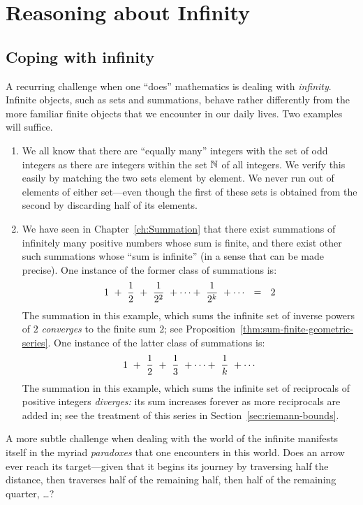 \section{Reasoning about Infinity}
\label{sec:reasoning-infinity}

\subsection{Coping with infinity}
\label{sec:coping-infinity}

A recurring challenge when one ``does'' mathematics is dealing with
{\em infinity}.  Infinite objects, such as sets and summations, behave
rather differently from the more familiar finite objects that we
encounter in our daily lives.  Two examples will suffice.  
\begin{enumerate}
\item
We all know that there are ``equally many'' integers with the set of
odd integers as there are integers within the set $\mathbb{N}$ of all
integers.  We verify this easily by matching the two sets element by
element.  We never run out of elements of either set---even though the
first of these sets is obtained from the second by discarding half of
its elements.
\item
We have seen in Chapter~\ref{ch:Summation} that there exist summations
of infinitely many positive numbers whose sum is finite, and there
exist other such summations whose ``sum is infinite'' (in a sense that
can be made precise).  One instance of the former class of summations is:
\[ 1 \ + \ {1 \over 2} \ + \ {1 \over 2^2} \ + \cdots + \ {1 \over
  2^k} \ + \cdots \ \ = \ \ 2
\]
The summation in this example, which sums the infinite set of inverse powers
of $2$ {\em converges} to the finite sum $2$; see
Proposition~\ref{thm:sum-finite-geometric-series}.  One instance of
the latter class of summations is:
\[ 1 \ + \ {1 \over 2} \ + \ {1 \over 3} \ + \cdots + \ {1 \over k} \ + \cdots \]
The summation in this example, which sums the infinite set of reciprocals of
positive integers {\em diverges:} its sum increases forever as more
reciprocals are added in; see the treatment of this series in
Section~\ref{sec:riemann-bounds}.
\end{enumerate}

A more subtle challenge when dealing with the world of the infinite
manifests itself in the myriad {\em paradoxes} that one encounters in
this world.  Does an arrow ever reach its target---given that it
begins its journey by traversing half the distance, then traverses
half of the remaining half, then half of the remaining quarter,
\ldots?

